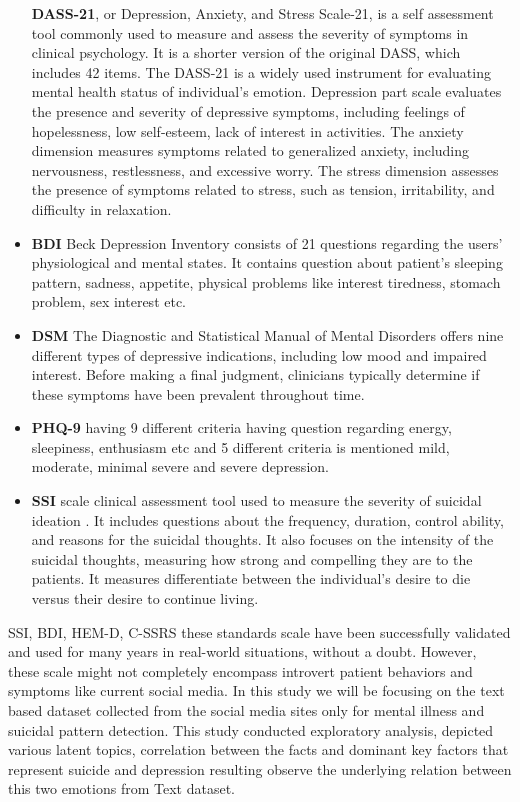 \documentclass[sn-mathphys,Numbered]{sn-jnl}%
\theoremstyle{thmstyleone}%
\theoremstyle{thmstyletwo}%
\theoremstyle{thmstylethree}%
\begin{document}
\begin{itemize}
\textbf{DASS-21}, or Depression, Anxiety, and Stress Scale-21, is a self assessment tool \cite{henry2005short} commonly used to measure and assess the severity of symptoms in clinical psychology. It is a shorter version of the original DASS, which includes 42 items. The DASS-21 is a widely used instrument for evaluating mental health status of individual's emotion. Depression part scale evaluates the presence and severity of depressive symptoms, including feelings of hopelessness, low self-esteem, lack of interest in activities. The anxiety dimension measures symptoms related to generalized anxiety, including nervousness, restlessness, and excessive worry. The stress dimension assesses the presence of symptoms related to stress, such as tension, irritability, and difficulty in relaxation. 
\item 
\textbf{BDI} Beck Depression Inventory \cite{beck2000weisman} consists of 21 questions regarding the users' physiological and mental states. It contains question about patient's sleeping pattern, sadness, appetite, physical problems like interest tiredness, stomach problem, sex interest etc. 
\item 
\textbf{DSM} The Diagnostic and Statistical Manual of Mental Disorders \cite{whooley2014diagnostic} offers nine different types of depressive indications, including low mood and impaired interest. Before making a final judgment, clinicians typically determine if these symptoms have been prevalent throughout time. 
\item 
\textbf{PHQ-9} having 9 different criteria having question regarding energy, sleepiness, enthusiasm etc and 5 different criteria is mentioned mild, moderate, minimal severe and severe depression. 
\item 
\textbf{SSI} scale clinical assessment tool used to measure the severity of suicidal ideation \cite{shen2020detecting}. It includes questions about the frequency, duration, control ability, and reasons for the suicidal thoughts. It also focuses on the intensity of the suicidal thoughts, measuring how strong and compelling they are to the patients. It measures differentiate between the individual's desire to die versus their desire to continue living.
\end{itemize}
SSI, BDI, HEM-D, C-SSRS these standards scale have been successfully validated and used for many years in real-world situations, without a doubt. However, these scale might not completely encompass introvert patient behaviors and symptoms like current social media. In this study we will be focusing on the text based dataset collected from the social media sites only for mental illness and suicidal pattern detection. This study conducted exploratory analysis, depicted various latent topics, correlation between the facts and dominant key factors that represent suicide and depression resulting observe the underlying relation between this two emotions from Text dataset. 
\end{document}
